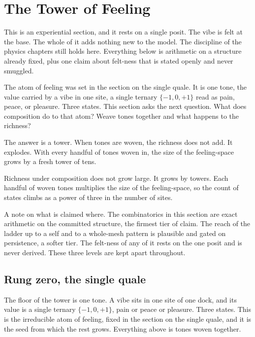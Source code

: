 \section{The Tower of Feeling}

This is an experiential section, and it rests on a single posit. The vibe is felt at the base. The whole of it adds nothing new to the model. The discipline of the physics chapters still holds here. Everything below is arithmetic on a structure already fixed, plus one claim about felt-ness that is stated openly and never smuggled.

The atom of feeling was set in the section on the single quale. It is one tone, the value carried by a vibe in one site, a single ternary $\{-1, 0, +1\}$ read as pain, peace, or pleasure. Three states. This section asks the next question. What does composition do to that atom? Weave tones together and what happens to the richness?

The answer is a tower. When tones are woven, the richness does not add. It explodes. With every handful of tones woven in, the size of the feeling-space grows by a fresh tower of tens.

\begin{principle}
Richness under composition does not grow large. It grows by towers. Each handful of woven tones multiplies the size of the feeling-space, so the count of states climbs as a power of three in the number of sites.
\end{principle}

A note on what is claimed where. The combinatorics in this section are exact arithmetic on the committed structure, the firmest tier of claim. The reach of the ladder up to a self and to a whole-mesh pattern is plausible and gated on persistence, a softer tier. The felt-ness of any of it rests on the one posit and is never derived. These three levels are kept apart throughout.

\subsection{Rung zero, the single quale}

The floor of the tower is one tone. A vibe sits in one site of one dock, and its value is a single ternary $\{-1, 0, +1\}$, pain or peace or pleasure. Three states. This is the irreducible atom of feeling, fixed in the section on the single quale, and it is the seed from which the rest grows. Everything above is tones woven together.

